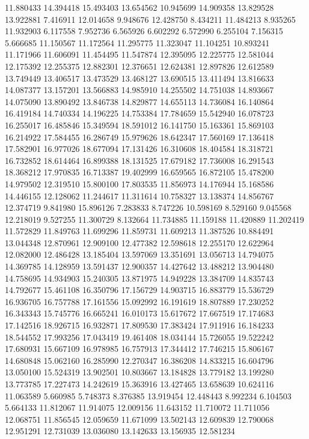 11.880433
14.394418
15.493403
13.654562
10.945699
14.909358
13.829528
13.922881
7.416911
12.014658
9.948676
12.428750
8.434211
11.484213
8.935265
11.932903
6.117558
7.952736
6.565926
6.602292
6.572990
6.255104
7.156315
5.666685
11.150567
11.172564
11.295775
11.323047
11.104251
10.893241
11.171966
11.606091
11.454495
11.547874
12.395095
12.225775
12.581044
12.175392
12.255375
12.882301
12.376651
12.624381
12.897826
12.612589
13.749449
13.406517
13.473529
13.468127
13.690515
13.411494
13.816633
14.087377
13.157201
13.566883
14.985910
14.255502
14.751038
14.893667
14.075090
13.890492
13.846738
14.829877
14.655113
14.736084
16.140864
16.419184
14.740334
14.196225
14.753384
17.784659
15.542940
16.078723
16.255017
16.485846
15.349594
18.591012
16.141750
15.163361
15.869103
16.214922
17.584455
16.286749
15.979626
18.642347
17.560169
17.136418
17.582901
16.977026
18.677094
17.131426
16.310608
18.404584
18.318721
16.732852
18.614464
16.899388
18.131525
17.679182
17.736008
16.291543
18.368212
17.970835
16.713387
19.402999
16.659565
16.872105
15.478200
14.979502
12.319510
15.800100
17.803535
11.856973
14.176944
15.168586
14.446155
12.128062
11.244617
11.311614
10.758327
13.138374
14.856767
12.374719
9.841980
15.896126
7.283833
8.747226
10.598169
8.529160
9.045568
12.218019
9.527255
11.300729
8.132664
11.734885
11.159188
11.420889
11.202419
11.572829
11.849763
11.699296
11.859731
11.609213
11.387526
10.884491
13.044348
12.870961
12.909100
12.477382
12.598618
12.255170
12.622964
12.082000
12.486428
13.185404
13.597069
13.351691
13.056713
14.794075
14.369785
14.128959
13.591437
12.900357
14.427642
13.488212
13.904480
14.758695
14.934903
15.240305
13.871975
14.949228
13.384709
14.835743
14.792677
15.461108
16.350796
17.156729
14.903715
16.883779
15.536729
16.936705
16.757788
17.161556
15.092992
16.191619
18.807889
17.230252
16.343343
15.745776
16.665241
16.010173
15.617672
17.667519
17.174683
17.142516
18.926715
16.932871
17.809530
17.383424
17.911916
16.184233
18.544552
17.993256
17.043419
19.461408
18.034144
15.726055
19.522242
17.680931
15.667109
16.978985
16.757913
17.344412
17.746215
15.806167
14.680848
15.062160
16.285990
12.270347
16.386208
14.833215
16.604796
13.050100
15.524319
13.902501
10.803667
13.184828
13.779182
13.199280
13.773785
17.227473
14.242619
15.363916
13.427465
13.658639
10.624116
11.063589
5.660985
5.748373
8.376385
13.919454
12.448443
8.992234
6.104503
5.664133
11.812067
11.914075
12.009156
11.643152
11.710072
11.711056
12.068751
11.856545
12.059659
11.671099
13.502143
12.609839
12.790068
12.951291
12.731039
13.036080
13.142633
13.156935
12.581234
